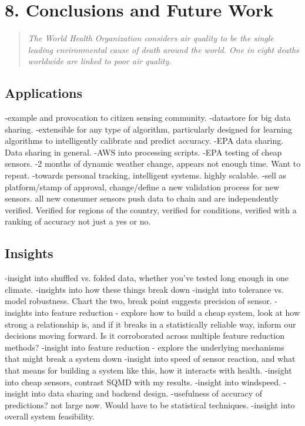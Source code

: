 \chapter{8. Conclusions and Future Work}

\begin{quote}
\textit{The World Health Organization considers air quality to be the single leading environmental cause of death around the world.  One in eight deaths worldwide are linked to poor air quality.} \newline
\end{quote}


\section{Applications}
-example and provocation to citizen sensing community.
-datastore for big data sharing.  
-extensible for any type of algorithm, particularly designed for learning algorithms to intelligently calibrate and predict accuracy.
-EPA data sharing.  Data sharing in general.
-AWS into processing scripts.
-EPA testing of cheap sensors.
-2 months of dynamic weather change, appears not enough time.  Want to repeat.
-towards personal tracking, intelligent systems.  highly scalable.
-sell as platform/stamp of approval, change/define a new validation process for new sensors.  all new consumer sensors push data to chain and are independently verified.  Verified for regions of the country, verified for conditions, verified with a ranking of accuracy not just a yes or no.


\section{Insights}

-insight into shuffled vs. folded data, whether you've tested long enough in one climate.
-insights into how these things break down
-insight into tolerance vs. model robustness.  Chart the two, break point suggests precision of sensor.
-insights into feature reduction - explore how to build a cheap system, look at how strong a relationship is, and if it breaks in a statistically reliable way, inform our decisions moving forward.  Is it corroborated across multiple feature reduction methods?
-insight into feature reduction - explore the underlying mechanisms that might break a system down 
-insight into speed of sensor reaction, and what that means for building a system like this, how it interacts with health.
-insight into cheap sensors, contrast SQMD with my results.
-insight into windspeed.
-insight into data sharing and backend design.
-usefulness of accuracy of predictions?  not large now.  Would have to be statistical techniques.
-insight into overall system feasibility.


